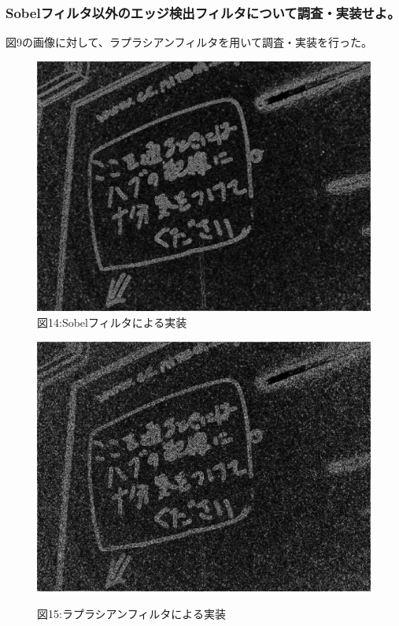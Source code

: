 ﻿\documentclass[a4j,11pt]{jarticle}
\begin{document}
\subsubsection{Sobelフィルタ以外のエッジ検出フィルタについて調査・実装せよ。}
図9の画像に対して、ラプラシアンフィルタを用いて調査・実装を行った。
\clearpage
\begin{figure}[tb]


 \begin{minipage}{0.49\hsize} %
   \center
   \includegraphics[width=\hsize]{./eps/edge-sobelin.eps}
   図14:Sobelフィルタによる実装
 \end{minipage}
 \begin{minipage}{0.49\hsize} %
   \center
   \includegraphics[width=\hsize]{./eps/edge-lapcianin.eps}

  図15:ラプラシアンフィルタによる実装
 \end{minipage}
 \label{fig:affine2}
\end{figure}
\end{document}
